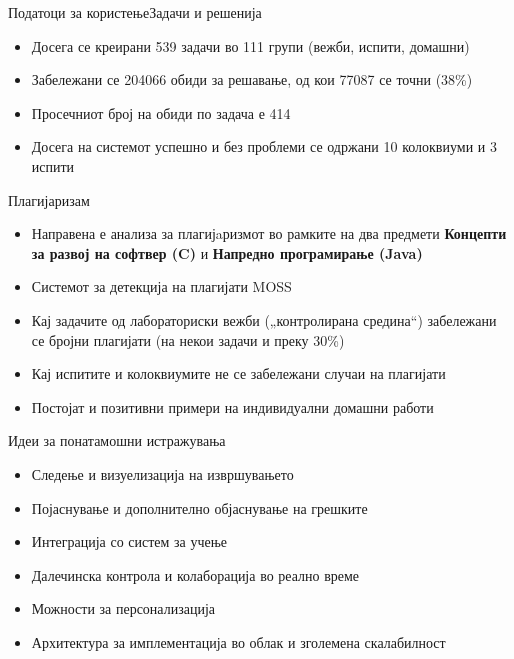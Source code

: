 \begin{frame}{Податоци за користење}{Задачи и решенија}
\begin{itemize}
  \item Досега се креирани 539 задачи во 111 групи (вежби, испити, домашни)
  \item Забележани се 204066 обиди за решавање, од кои 77087 се точни (38\%)
  \item Просечниот број на обиди по задача е 414
  \item Досега на системот успешно и без проблеми се одржани 10 колоквиуми и 3
  испити
\end{itemize}
\end{frame}

\begin{frame}{Плагијаризам}
\begin{itemize}
  \item Направена е анализа за плагијaризмот во рамките на два предмети \textbf{Концепти за
развој на софтвер (C)} и \textbf{Напредно програмирање (Java)}
\item Системот за детекција на плагијати MOSS
\item Кај задачите од лабораториски вежби („контролирана средина“) забележани се
бројни плагијати (на некои задачи и преку 30\%)
\item Кај испитите и колоквиумите не се забележани случаи на плагијати
\item Постојат и позитивни примери на индивидуални домашни работи
\end{itemize}
\end{frame}


\begin{frame}{Идеи за понатамошни истражувања}
\begin{itemize}
  \item Следење и визуелизација на извршувањето
  \item Појаснување и дополнително објаснување на грешките
  \item Интеграција со систем за учење
  \item Далечинска контрола и колаборација во реално време
  \item Можности за персонализација
  \item Архитектура за имплементација во облак и зголемена скалабилност
\end{itemize}
\end{frame}

